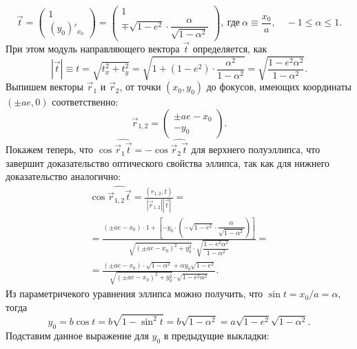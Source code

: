 \begin{equation*}
	\vec t =
	\begin{pmatrix}
		1\\
		(y_0)'_{x_0}
	\end{pmatrix}
	=
	\begin{pmatrix}
		1\\
		\mp \sqrt{1 - e^2} \cdot \dfrac{\alpha}{\sqrt{1 - \alpha^2}}
	\end{pmatrix},~\text{где}~ \alpha \equiv \frac{x_0}{a},\quad -1 \leqslant \alpha \leqslant 1.
\end{equation*}
При этом модуль направляющего вектора $\vec t$ определяется, как
\begin{equation*}
	|\vec t| \equiv t = \sqrt{t_x^2 + t_y^2} = \sqrt{1 + (1 - e^2) \cdot \frac{\alpha^2}{1 - \alpha^2}} = \sqrt{\frac{1 - e^2 \alpha^2}{1 - \alpha^2}}.
\end{equation*}
Выпишем векторы $\vec r_1$ и $\vec r_2$, от точки $(x_0, y_0)$ до фокусов, имеющих координаты $(\pm ae, 0)$ соответственно:
\begin{equation*}
	\vec r_{1,2} =
	\begin{pmatrix}
		\pm ae - x_0\\
		-y_0
	\end{pmatrix}.
\end{equation*}
Покажем теперь, что $\cos \widehat{\vec r_1 \vec t} = - \cos \widehat{\vec r_2 \vec t}$ для верхнего полуэллипса, что завершит доказательство оптического свойства эллипса, так как для нижнего доказательство аналогично:
\begin{multline*}
	\cos \widehat{\vec r_{1, 2}  \vec t}
	= \frac{(r_{1, 2}, t)}{|\vec r_{1, 2}| | \vec t|} = \\
	= \frac{(\pm ae - x_0) \cdot 1 + \left[ -y_0 \cdot \left(- \sqrt{1 - e^2} \cdot \dfrac{\alpha}{\sqrt{1 - \alpha^2}} \right) \right]}{\sqrt{(\pm ae - x_0)^2 + y_0^2} \cdot \sqrt{\dfrac{1 - e^2 \alpha^2}{1 - \alpha^2}}} =\\
	= \frac{(\pm ae - x_0) \cdot \sqrt{1 - \alpha^2} + \alpha y_0\sqrt{1 - e^2}}{\sqrt{(\pm ae - x_0)^2 + y_0^2} \cdot \sqrt{1 - e^2 \alpha^2}}.
\end{multline*}
Из параметричекого уравнения эллипса можно получить, что $\sin t = x_0/a = \alpha$, тогда
\begin{equation*}
	y_0 = b \cos t = b \sqrt{1 - \sin^2 t} = b \sqrt{1 - \alpha^2} = a \sqrt{1 - e^2} \sqrt{1 - \alpha^2}.
\end{equation*}
Подставим данное выражение для $y_0$ в предыдущие выкладки:
